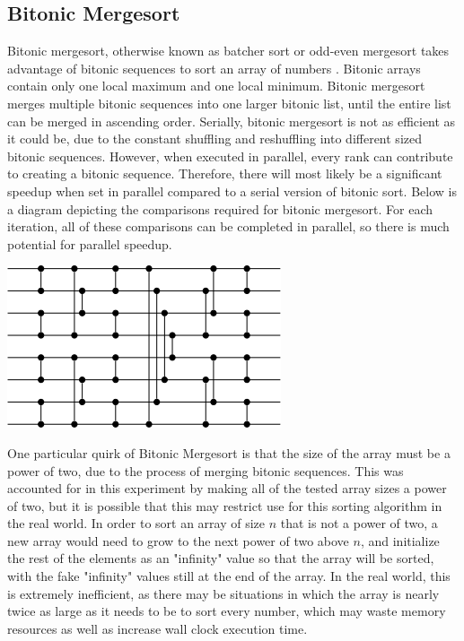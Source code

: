 \documentclass[10pt,letterpaper]{article}
\begin{document}
\begin{multicols}{2}
\subsection{Bitonic Mergesort}
Bitonic mergesort, otherwise known as batcher sort or odd-even mergesort takes advantage of bitonic sequences to sort an array of numbers \cite{Knuth:1998:ACP:280635}. Bitonic arrays contain only one local maximum and one local minimum. Bitonic mergesort merges multiple bitonic sequences into one larger bitonic list, until the entire list can be merged in ascending order. Serially, bitonic mergesort is not as efficient as it could be, due to the constant shuffling and reshuffling into different sized bitonic sequences. However, when executed in parallel, every rank can contribute to creating a bitonic sequence. Therefore, there will most likely be a significant speedup when set in parallel compared to a serial version of bitonic sort. Below is a diagram depicting the comparisons required for bitonic mergesort. For each iteration, all of these comparisons can be completed in parallel, so there is much potential for parallel speedup.

\begin{center}
\includegraphics[scale=0.7]{bitonic_diagram}
\end{center}

One particular quirk of Bitonic Mergesort is that the size of the array must be a power of two, due to the process of merging bitonic sequences. This was accounted for in this experiment by making all of the tested array sizes a power of two, but it is possible that this may restrict use for this sorting algorithm in the real world. In order to sort an array of size $n$ that is not a power of two, a new array would need to grow to the next power of two above $n$, and initialize the rest of the elements as an "infinity" value so that the array will be sorted, with the fake "infinity" values still at the end of the array. In the real world, this is extremely inefficient, as there may be situations in which the array is nearly twice as large as it needs to be to sort every number, which may waste memory resources as well as increase wall clock execution time.

\end{multicols}
\end{document}
